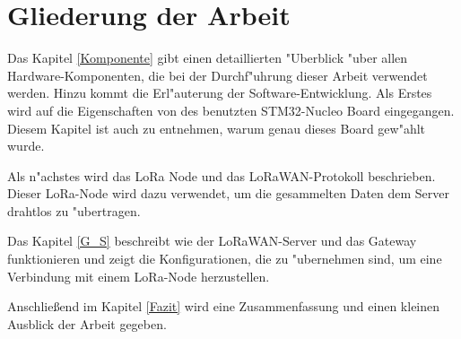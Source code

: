 \vspace{5cm}

\section{Gliederung der Arbeit}

Das Kapitel \ref{Komponente} gibt einen detaillierten "Uberblick "uber allen Hardware-Komponenten, die bei der Durchf"uhrung dieser Arbeit verwendet werden. Hinzu kommt die Erl"auterung der Software-Entwicklung. Als Erstes wird auf die Eigenschaften von des benutzten STM32-Nucleo Board eingegangen. Diesem Kapitel ist auch zu entnehmen, warum genau dieses Board gew"ahlt wurde. 

Als n"achstes wird das LoRa Node und das LoRaWAN-Protokoll beschrieben. Dieser LoRa-Node wird dazu verwendet, um die gesammelten Daten dem Server drahtlos zu "ubertragen.

Das Kapitel \ref{G_S} beschreibt wie der LoRaWAN-Server und das Gateway funktionieren und zeigt die Konfigurationen, die zu "ubernehmen sind, um eine Verbindung mit einem LoRa-Node herzustellen.

Anschlie\ss{}end im Kapitel \ref{Fazit} wird eine Zusammenfassung und einen kleinen Ausblick der Arbeit gegeben.
   